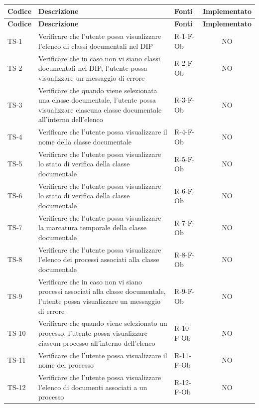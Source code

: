 \documentclass[a4paper,12pt]{article}
\begin{document}
\setlength{\LTleft}{-0.4cm}
\renewcommand{\arraystretch}{1.2}
\begin{longtable}{|p{1.5cm}|p{8.3cm}|p{2.4cm}|c|}
\hline
\rowcolor{zpusgreen!30}
\textbf{Codice} & \textbf{Descrizione} & \textbf{Fonti} & \textbf{Implementato} \\
\hline
\endfirsthead
\rowcolor{zpusgreen!30}
\textbf{Codice} & \textbf{Descrizione} & \textbf{Fonti} & \textbf{Implementato} \\
\hline
\endhead

TS-1 & Verificare che l'utente possa visualizzare l'elenco di classi documentali nel DIP & R-1-F-Ob & NO \\
\hline
TS-2 & Verificare che in caso non vi siano classi documentali nel DIP, l'utente possa visualizzare un messaggio di errore & R-2-F-Ob & NO \\
\hline
TS-3 & Verificare che quando viene selezionata una classe documentale, l'utente possa visualizzare ciascuna classe documentale all'interno dell'elenco & R-3-F-Ob & NO \\
\hline
TS-4 & Verificare che l'utente possa visualizzare il nome della classe documentale & R-4-F-Ob & NO \\
\hline
TS-5 & Verificare che l'utente possa visualizzare lo stato di verifica della classe documentale & R-5-F-Ob & NO \\
\hline
TS-6 & Verificare che l'utente possa visualizzare lo stato di verifica della classe documentale & R-6-F-Ob & NO \\
\hline
TS-7 & Verificare che l'utente possa visualizzare la marcatura temporale della classe documentale & R-7-F-Ob & NO \\
\hline
TS-8 & Verificare che l'utente possa visualizzare l'elenco dei processi associati alla classe documentale & R-8-F-Ob & NO \\
\hline
TS-9 & Verificare che in caso non vi siano processi associati alla classe documentale, l'utente possa visualizzare un messaggio di errore & R-9-F-Ob & NO \\
\hline
TS-10 & Verificare che quando viene selezionato un processo, l'utente possa visualizzare ciascun processo all'interno dell'elenco & R-10-F-Ob & NO \\
\hline
TS-11 & Verificare che l'utente possa visualizzare il nome del processo & R-11-F-Ob & NO \\
\hline
TS-12 & Verificare che l'utente possa visualizzare l'elenco di documenti associati a un processo & R-12-F-Ob & NO \\

\end{longtable}
\end{document}
